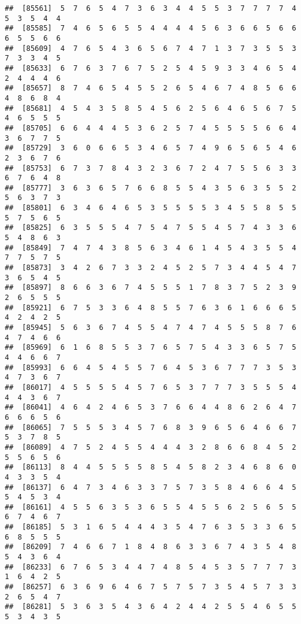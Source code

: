 \documentclass[
]{book}
\begin{document}
\begin{verbatim}
##  [85561]  5  7  6  5  4  7  3  6  3  4  4  5  5  3  7  7  7  7  4  5  3  5  4  4
##  [85585]  7  4  6  5  6  5  5  4  4  4  4  5  6  3  6  6  5  6  6  6  5  5  6  6
##  [85609]  4  7  6  5  4  3  6  5  6  7  4  7  1  3  7  3  5  5  3  7  3  3  4  5
##  [85633]  6  7  6  3  7  6  7  5  2  5  4  5  9  3  3  4  6  5  4  2  4  4  4  6
##  [85657]  8  7  4  6  5  4  5  5  2  6  5  4  6  7  4  8  5  6  6  4  8  6  8  4
##  [85681]  4  5  4  3  5  8  5  4  5  6  2  5  6  4  6  5  6  7  5  4  6  5  5  5
##  [85705]  6  6  4  4  4  5  3  6  2  5  7  4  5  5  5  5  6  6  4  3  6  7  7  5
##  [85729]  3  6  0  6  6  5  3  4  6  5  7  4  9  6  5  6  5  4  6  2  3  6  7  6
##  [85753]  6  7  3  7  8  4  3  2  3  6  7  2  4  7  5  5  6  3  3  6  7  6  4  8
##  [85777]  3  6  3  6  5  7  6  6  8  5  5  4  3  5  6  3  5  5  2  5  6  3  7  3
##  [85801]  6  3  4  6  4  6  5  3  5  5  5  5  3  4  5  5  8  5  5  5  7  5  6  5
##  [85825]  6  3  5  5  5  4  7  5  4  7  5  5  4  5  7  4  3  3  6  5  4  8  6  3
##  [85849]  7  4  7  4  3  8  5  6  3  4  6  1  4  5  4  3  5  5  4  7  7  5  7  5
##  [85873]  3  4  2  6  7  3  3  2  4  5  2  5  7  3  4  4  5  4  7  3  6  5  4  5
##  [85897]  8  6  6  3  6  7  4  5  5  5  1  7  8  3  7  5  2  3  9  2  6  5  5  5
##  [85921]  6  7  5  3  3  6  4  8  5  5  7  6  3  6  1  6  6  6  5  4  2  4  2  5
##  [85945]  5  6  3  6  7  4  5  5  4  7  4  7  4  5  5  5  8  7  6  4  7  4  6  6
##  [85969]  6  1  6  8  5  5  3  7  6  5  7  5  4  3  3  6  5  7  5  4  4  6  6  7
##  [85993]  6  6  4  5  4  5  5  7  6  4  5  3  6  7  7  7  3  5  3  4  7  3  6  7
##  [86017]  4  5  5  5  5  4  5  7  6  5  3  7  7  7  3  5  5  5  4  4  4  3  6  7
##  [86041]  4  6  4  2  4  6  5  3  7  6  6  4  4  8  6  2  6  4  7  6  6  6  5  6
##  [86065]  7  5  5  5  3  4  5  7  6  8  3  9  6  5  6  4  6  6  7  5  3  7  8  5
##  [86089]  4  7  5  2  4  5  5  4  4  4  3  2  8  6  6  8  4  5  2  5  5  6  5  6
##  [86113]  8  4  4  5  5  5  5  8  5  4  5  8  2  3  4  6  8  6  0  4  3  3  5  4
##  [86137]  6  4  7  3  4  6  3  3  7  5  7  3  5  8  4  6  6  4  5  5  4  5  3  4
##  [86161]  4  5  5  6  3  5  3  6  5  5  4  5  5  6  2  5  6  5  5  6  7  4  6  7
##  [86185]  5  3  1  6  5  4  4  4  3  5  4  7  6  3  5  3  3  6  5  6  8  5  5  5
##  [86209]  7  4  6  6  7  1  8  4  8  6  3  3  6  7  4  3  5  4  8  5  4  3  6  4
##  [86233]  6  7  6  5  3  4  4  7  4  8  5  4  5  3  5  7  7  7  3  1  6  4  2  5
##  [86257]  6  3  6  9  6  4  6  7  5  7  5  7  3  5  4  5  7  3  3  2  6  5  4  7
##  [86281]  5  3  6  3  5  4  3  6  4  2  4  4  2  5  5  4  6  5  5  5  3  4  3  5

\end{verbatim}
\end{document}
